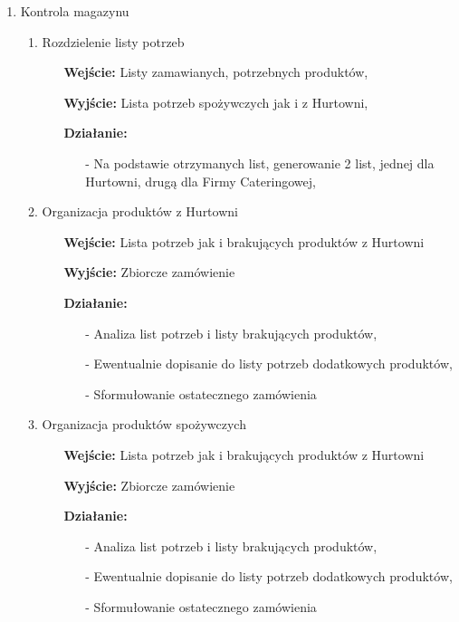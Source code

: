 \documentclass[a4paper, 11pt]{article}
\begin{document}
\begin{enumerate}[label*=\arabic*.]
		\item Kontrola magazynu
		\begin{enumerate}[label*=\arabic*.]
			\item Rozdzielenie listy potrzeb
			\begin{itemize}
				\item [\textbf{Wejście:}] Listy zamawianych, potrzebnych produktów,
				\item [\textbf{Wyjście:}] Lista potrzeb spożywczych jak i z Hurtowni,
				\item [\textbf{Działanie:}] 
				\begin{itemize}
					\item[-] Na podstawie otrzymanych list, generowanie 2 list, jednej dla Hurtowni, drugą dla Firmy Cateringowej,
				\end{itemize}
			\end{itemize}
			\item Organizacja produktów z Hurtowni			
			\begin{itemize}
				\item [\textbf{Wejście:}] Lista potrzeb jak i brakujących produktów z Hurtowni
				\item [\textbf{Wyjście:}] Zbiorcze zamówienie
				\item [\textbf{Działanie:}] 
				\begin{itemize}
					\item[-] Analiza list potrzeb i listy brakujących produktów,
					\item[-] Ewentualnie dopisanie do listy potrzeb dodatkowych produktów,
					\item[-] Sformułowanie ostatecznego zamówienia
				\end{itemize}
			\end{itemize}
			\item Organizacja produktów spożywczych
			\begin{itemize}
				\item [\textbf{Wejście:}] Lista potrzeb jak i brakujących produktów z Hurtowni
				\item [\textbf{Wyjście:}] Zbiorcze zamówienie
				\item [\textbf{Działanie:}] 
				\begin{itemize}
					\item[-] Analiza list potrzeb i listy brakujących produktów,
					\item[-] Ewentualnie dopisanie do listy potrzeb dodatkowych produktów,
					\item[-] Sformułowanie ostatecznego zamówienia

\end{itemize}
\end{itemize}
\end{enumerate}
\end{enumerate}
\end{document}
